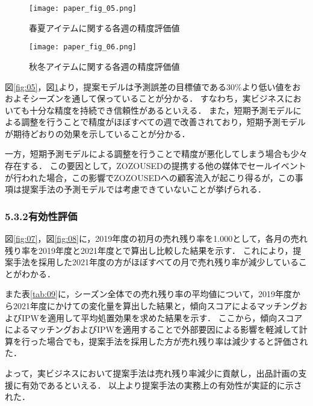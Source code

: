 \documentclass[dvipdfmx]{jreport}
\begin{document}
\begin{figure}[h]
    \centering
    \begin{minipage}[b]{0.49\columnwidth}
        \centering
        \texttt{[image: paper\_fig\_05.png]}
        \caption{春夏アイテムに関する各週の精度評価値}\label{fig:05}
    \end{minipage}
    \centering
    \begin{minipage}[b]{0.49\columnwidth}
        \centering
        \texttt{[image: paper\_fig\_06.png]}
        \caption{秋冬アイテムに関する各週の精度評価値}\label{fig:06}
    \end{minipage}
\end{figure}

図\ref{fig:05}，図\ref{fig:06}より，提案モデルは予測誤差の目標値である30\%より低い値をおおよそシーズンを通して保っていることが分かる．
すなわち，実ビジネスにおいても十分な精度を持続でき信頼性があるといえる．
また，短期予測モデルによる調整を行うことで精度がほぼすべての週で改善されており，短期予測モデルが期待どおりの効果を示していることが分かる．

一方，短期予測モデルによる調整を行うことで精度が悪化してしまう場合も少々存在する．
この要因として，ZOZOUSEDの提携する他の媒体でセールイベントが行われた場合，この影響でZOZOUSEDへの顧客流入が起こり得るが，この事項は提案手法の予測モデルでは考慮できていないことが挙げられる．

\subsubsection{5.3.2\hspace{10pt}有効性評価}
図\ref{fig:07}，図\ref{fig:08}に，2019年度の初月の売れ残り率を1.000として，各月の売れ残り率を2019年度と2021年度とで算出し比較した結果を示す．
これにより，提案手法を採用した2021年度の方がほぼすべての月で売れ残り率が減少していることがわかる．

また表\ref{tab:09}に，シーズン全体での売れ残り率の平均値について，2019年度から2021年度にかけての変化量を算出した結果と，傾向スコアによるマッチングおよびIPWを適用して平均処置効果を求めた結果を示す．
ここから，傾向スコアによるマッチングおよびIPWを適用することで外部要因による影響を軽減して計算を行った場合でも，提案手法を採用した方が売れ残り率は減少すると評価された．

よって，実ビジネスにおいて提案手法は売れ残り率減少に貢献し，出品計画の支援に有効であるといえる．
以上より提案手法の実務上の有効性が実証的に示された．
\end{document}
